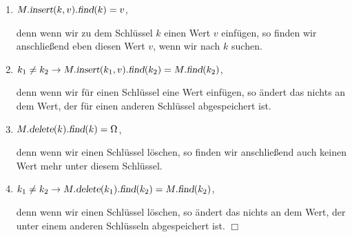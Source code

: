 \begin{Definition}[Abbildung]
{\begin{enumerate}
\begin{enumerate}
              denn der Aufruf $\textsl{Map}()$ erzeugt eine leere Abbildung.
        \item $M.\textsl{insert}(k, v).\textsl{find}(k) = v$,

              denn wenn wir zu dem Schl\"ussel $k$ einen Wert $v$ einf\"ugen, so finden 
              wir anschlie{\ss}end eben diesen Wert $v$, wenn wir nach $k$ suchen.
        \item $k_1 \not= k_2 \rightarrow M.\textsl{insert}(k_1, v).\textsl{find}(k_2) = M.\textsl{find}(k_2)$,

              denn wenn wir f\"ur einen Schl\"ussel eine Wert einf\"ugen, so \"andert das
              nichts an dem Wert, der f\"ur einen anderen Schl\"ussel abgespeichert ist.
        \item $M.\textsl{delete}(k).\textsl{find}(k) = \Omega$,

              denn wenn wir einen Schl\"ussel l\"oschen, so finden wir anschlie{\ss}end auch
              keinen Wert mehr unter diesem Schl\"ussel.
        \item $k_1 \not= k_2 \rightarrow M.\textsl{delete}(k_1).\textsl{find}(k_2) = M.\textsl{find}(k_2)$,

              denn wenn wir einen Schl\"ussel  l\"oschen, so \"andert das nichts an dem
              Wert, der unter einem anderen Schl\"usseln abgespeichert ist. \hspace*{\fill} $\Box$
        \end{enumerate}
  \end{enumerate}
}
\end{Definition}


